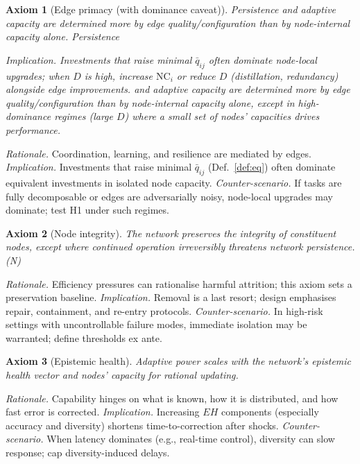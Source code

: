 \documentclass[12pt]{article}
\newtheorem{axiom}{Axiom}
\begin{document}
\begin{axiom}[Edge primacy (with dominance caveat)] Persistence and adaptive capacity are determined more by edge quality/configuration than by node-internal capacity alone. Persistence

\emph{Implication.} Investments that raise minimal $\bar q_{ij}$ often dominate node-local upgrades; when $D$ is high, increase $\mathrm{NC}_i$ or reduce $D$ (distillation, redundancy) alongside edge improvements.
 and adaptive capacity are determined more by edge quality/configuration than by node-internal capacity alone, \emph{except} in high-dominance regimes (large $D$) where a small set of nodes' capacities drives performance.

\end{axiom}
\emph{Rationale.} Coordination, learning, and resilience are mediated by edges. 
\emph{Implication.} Investments that raise minimal $\bar{q}_{ij}$ (Def.~\ref{def:eq}) often dominate equivalent investments in isolated node capacity.
\emph{Counter-scenario.} If tasks are fully decomposable or edges are adversarially noisy, node-local upgrades may dominate; test H1 under such regimes.

\begin{axiom}[Node integrity] The network preserves the integrity of constituent nodes, except where continued operation irreversibly threatens network persistence. (N)

\end{axiom}
\emph{Rationale.} Efficiency pressures can rationalise harmful attrition; this axiom sets a preservation baseline. 
\emph{Implication.} Removal is a last resort; design emphasises repair, containment, and re-entry protocols.
\emph{Counter-scenario.} In high-risk settings with uncontrollable failure modes, immediate isolation may be warranted; define thresholds ex ante.

\begin{axiom}[Epistemic health] Adaptive power scales with the network's epistemic health vector and nodes' capacity for rational updating.

\end{axiom}
\emph{Rationale.} Capability hinges on what is known, how it is distributed, and how fast error is corrected. 
\emph{Implication.} Increasing $EH$ components (especially accuracy and diversity) shortens time-to-correction after shocks.
\emph{Counter-scenario.} When latency dominates (e.g., real-time control), diversity can slow response; cap diversity-induced delays.
\end{document}

